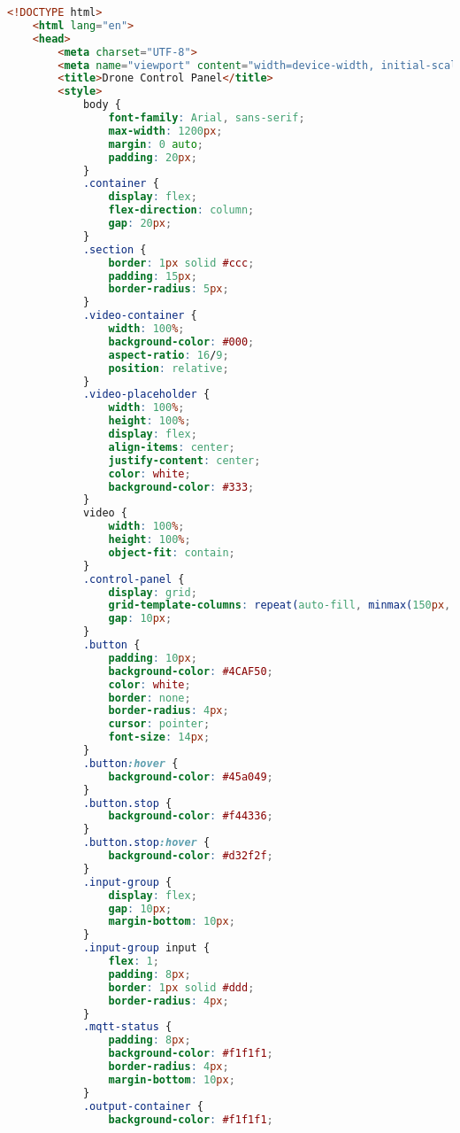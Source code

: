\begin{lstlisting}[language=html]
    <!DOCTYPE html>
    <html lang="en">
    <head>
        <meta charset="UTF-8">
        <meta name="viewport" content="width=device-width, initial-scale=1.0">
        <title>Drone Control Panel</title>
        <style>
            body {
                font-family: Arial, sans-serif;
                max-width: 1200px;
                margin: 0 auto;
                padding: 20px;
            }
            .container {
                display: flex;
                flex-direction: column;
                gap: 20px;
            }
            .section {
                border: 1px solid #ccc;
                padding: 15px;
                border-radius: 5px;
            }
            .video-container {
                width: 100%;
                background-color: #000;
                aspect-ratio: 16/9;
                position: relative;
            }
            .video-placeholder {
                width: 100%;
                height: 100%;
                display: flex;
                align-items: center;
                justify-content: center;
                color: white;
                background-color: #333;
            }
            video {
                width: 100%;
                height: 100%;
                object-fit: contain;
            }
            .control-panel {
                display: grid;
                grid-template-columns: repeat(auto-fill, minmax(150px, 1fr));
                gap: 10px;
            }
            .button {
                padding: 10px;
                background-color: #4CAF50;
                color: white;
                border: none;
                border-radius: 4px;
                cursor: pointer;
                font-size: 14px;
            }
            .button:hover {
                background-color: #45a049;
            }
            .button.stop {
                background-color: #f44336;
            }
            .button.stop:hover {
                background-color: #d32f2f;
            }
            .input-group {
                display: flex;
                gap: 10px;
                margin-bottom: 10px;
            }
            .input-group input {
                flex: 1;
                padding: 8px;
                border: 1px solid #ddd;
                border-radius: 4px;
            }
            .mqtt-status {
                padding: 8px;
                background-color: #f1f1f1;
                border-radius: 4px;
                margin-bottom: 10px;
            }
            .output-container {
                background-color: #f1f1f1;

\end{lstlisting}
